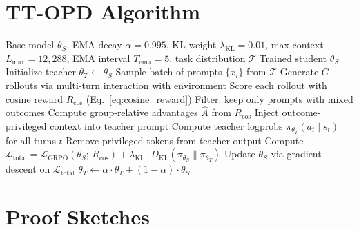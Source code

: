 \documentclass{article}
\begin{document}
\section{TT-OPD Algorithm}
\label{app:algorithm}

\begin{algorithm}[h]
\caption{Turn-Level Truncated On-Policy Distillation (TT-OPD)}
\label{alg:ttopd}
\begin{algorithmic}[1]
\REQUIRE Base model $\theta_S$, EMA decay $\alpha{=}0.995$, KL weight $\lambda_{\text{KL}}{=}0.01$, max context $L_{\max}{=}12{,}288$, EMA interval $T_{\text{ema}}{=}5$, task distribution $\mathcal{T}$
\ENSURE Trained student $\theta_S$
\STATE Initialize teacher $\theta_T \leftarrow \theta_S$
    \STATE Sample batch of prompts $\{x_i\}$ from $\mathcal{T}$
        \STATE Generate $G$ rollouts via multi-turn interaction with environment
        \STATE Score each rollout with cosine reward $R_{\text{cos}}$ (Eq.~\ref{eq:cosine_reward})
    \ENDFOR
    \STATE Filter: keep only prompts with mixed outcomes 
    \STATE Compute group-relative advantages $\hat{A}$ from $R_{\text{cos}}$
        \STATE Inject outcome-privileged context into teacher prompt
        \STATE Compute teacher logprobs $\pi_{\theta_T}(a_t \mid s_t)$ for all turns $t$
        \STATE Remove privileged tokens from teacher output
    \ENDFOR
    \STATE Compute $\mathcal{L}_{\text{total}} = \mathcal{L}_{\text{GRPO}}(\theta_S;\, R_{\text{cos}}) + \lambda_{\text{KL}} \cdot D_{\text{KL}}(\pi_{\theta_S} \| \pi_{\theta_T})$ 
    \STATE Update $\theta_S$ via gradient descent on $\mathcal{L}_{\text{total}}$
        \STATE $\theta_T \leftarrow \alpha \cdot \theta_T + (1 - \alpha) \cdot \theta_S$ 
    \ENDIF
\ENDFOR
\end{algorithmic}
\end{algorithm}


\section{Proof Sketches}
\label{app:proofs}
\end{document}
